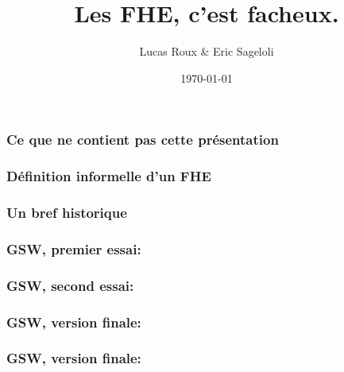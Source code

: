 \documentclass[15pt]{beamer}
\title{Les FHE, c'est facheux.}
\date{\today}
\author{Lucas Roux \& Eric Sageloli}
\begin{document}

\begin{frame}
  \maketitle
\end{frame}


\begin{frame}
\frametitle{Ce que ne contient pas cette présentation}
\end{frame}


\begin{frame}
\frametitle{Définition informelle d'un FHE}
\end{frame}


\begin{frame} 
\frametitle{Un bref historique}
\end{frame} 


\begin{frame} 
\frametitle{GSW, premier essai:}
\end{frame} 

  
\begin{frame} 
\frametitle{GSW, second essai:}
\end{frame} 

  
\begin{frame} 
\frametitle{GSW, version finale:}
\end{frame} 
  
  
\begin{frame} 
\frametitle{GSW, version finale:}
\end{frame} 
\end{document}
